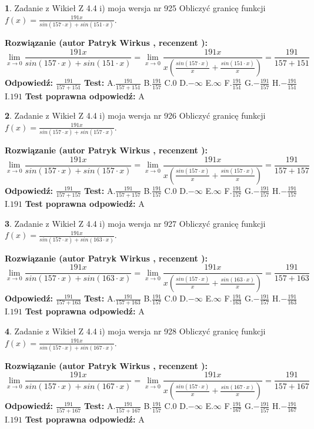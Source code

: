 \documentclass[12pt, a4paper]{article}
\theoremstyle{definition} %
\newtheorem{zad}{}
\newcommand{\zadStart}[1]{\begin{zad}#1\newline}
\newcommand{\zadStop}{\end{zad}}
\newcommand{\rozwStart}[2]{\noindent \textbf{Rozwiązanie (autor #1 , recenzent #2): }\newline}
\newcommand{\rozwStop}{\newline}
\newcommand{\odpStart}{\noindent \textbf{Odpowiedź:}\newline}
\newcommand{\odpStop}{\newline}
\newcommand{\testStart}{\noindent \textbf{Test:}\newline}
\newcommand{\testStop}{\newline}
\newcommand{\kluczStart}{\noindent \textbf{Test poprawna odpowiedź:}\newline}
\newcommand{\kluczStop}{\newline}
\begin{document}
\zadStart{Zadanie z Wikieł Z 4.4 i) moja wersja nr 925}
Obliczyć granicę funkcji $f(x)=\frac{191x}{sin(157\cdot x) +sin(151\cdot x)}$.
\zadStop
\rozwStart{Patryk Wirkus}{}
$$\lim\limits_{x\to 0}\frac{191x}{sin(157\cdot x) +sin(151\cdot x)}=\lim\limits_{x\to 0}\frac{191x}{x(\frac{sin(157\cdot x)}{x}+\frac{sin(151\cdot x)}{x})}=\frac{191}{157+151}$$
\rozwStop
\odpStart
$\frac{191}{157+151}$
\odpStop
\testStart
A.$\frac{191}{157+151}$
B.$\frac{191}{157}$
C.$0$
D.$-\infty$
E.$\infty$
F.$\frac{191}{151}$
G.$-\frac{191}{157}$
H.$-\frac{191}{151}$
I.$191$
\testStop
\kluczStart
A
\kluczStop



\zadStart{Zadanie z Wikieł Z 4.4 i) moja wersja nr 926}
Obliczyć granicę funkcji $f(x)=\frac{191x}{sin(157\cdot x) +sin(157\cdot x)}$.
\zadStop
\rozwStart{Patryk Wirkus}{}
$$\lim\limits_{x\to 0}\frac{191x}{sin(157\cdot x) +sin(157\cdot x)}=\lim\limits_{x\to 0}\frac{191x}{x(\frac{sin(157\cdot x)}{x}+\frac{sin(157\cdot x)}{x})}=\frac{191}{157+157}$$
\rozwStop
\odpStart
$\frac{191}{157+157}$
\odpStop
\testStart
A.$\frac{191}{157+157}$
B.$\frac{191}{157}$
C.$0$
D.$-\infty$
E.$\infty$
F.$\frac{191}{157}$
G.$-\frac{191}{157}$
H.$-\frac{191}{157}$
I.$191$
\testStop
\kluczStart
A
\kluczStop



\zadStart{Zadanie z Wikieł Z 4.4 i) moja wersja nr 927}
Obliczyć granicę funkcji $f(x)=\frac{191x}{sin(157\cdot x) +sin(163\cdot x)}$.
\zadStop
\rozwStart{Patryk Wirkus}{}
$$\lim\limits_{x\to 0}\frac{191x}{sin(157\cdot x) +sin(163\cdot x)}=\lim\limits_{x\to 0}\frac{191x}{x(\frac{sin(157\cdot x)}{x}+\frac{sin(163\cdot x)}{x})}=\frac{191}{157+163}$$
\rozwStop
\odpStart
$\frac{191}{157+163}$
\odpStop
\testStart
A.$\frac{191}{157+163}$
B.$\frac{191}{157}$
C.$0$
D.$-\infty$
E.$\infty$
F.$\frac{191}{163}$
G.$-\frac{191}{157}$
H.$-\frac{191}{163}$
I.$191$
\testStop
\kluczStart
A
\kluczStop



\zadStart{Zadanie z Wikieł Z 4.4 i) moja wersja nr 928}
Obliczyć granicę funkcji $f(x)=\frac{191x}{sin(157\cdot x) +sin(167\cdot x)}$.
\zadStop
\rozwStart{Patryk Wirkus}{}
$$\lim\limits_{x\to 0}\frac{191x}{sin(157\cdot x) +sin(167\cdot x)}=\lim\limits_{x\to 0}\frac{191x}{x(\frac{sin(157\cdot x)}{x}+\frac{sin(167\cdot x)}{x})}=\frac{191}{157+167}$$
\rozwStop
\odpStart
$\frac{191}{157+167}$
\odpStop
\testStart
A.$\frac{191}{157+167}$
B.$\frac{191}{157}$
C.$0$
D.$-\infty$
E.$\infty$
F.$\frac{191}{167}$
G.$-\frac{191}{157}$
H.$-\frac{191}{167}$
I.$191$
\testStop
\kluczStart
A
\kluczStop
\end{document}

